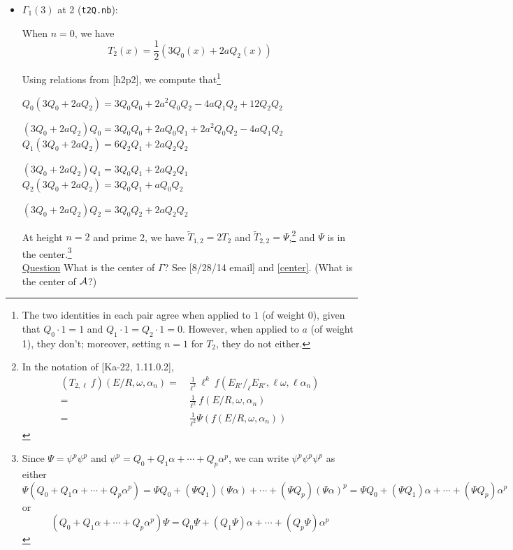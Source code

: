 \documentclass{rs}
\theoremstyle{definition}
\theoremstyle{remark}
\newcommand{\CA}{{\cal A}}
\newcommand{\A}{\alpha}
\newcommand{\G}{\Gamma}
\newcommand{\Tt}{\widetilde{T}}
\renewcommand{\=}{\approx}
\renewcommand{\-}{\sim}
\numberwithin{equation}{section}
\numberwithin{thm}{section}
\begin{document}
\begin{itemize}
 \item $\G_1(3)$ at 2 (\texttt{t2Q.nb}): 

 When $n = 0$, we have 
 \[
  T_2(x) = \dfrac{1}{2} (3 Q_0(x) + 2 a Q_2(x)) 
 \]

 Using relations from [h2p2], we compute that\footnote{The two identities in each pair agree when applied to $1$ (of weight 0), 
 given that $Q_0 \cdot 1 = 1$ and $Q_1 \cdot 1 = Q_2 \cdot 1 = 0$.  
 However, when applied to $a$ (of weight 1), they don't; 
 moreover, setting $n = 1$ for $T_2$, they do not either.  } 

 $Q_0 (3 Q_0 + 2 a Q_2) = 3 Q_0 Q_0 + 2 a^2 Q_0 Q_2 - 4 a Q_1 Q_2 + 12 Q_2 Q_2$ 

 $(3 Q_0 + 2 a Q_2) Q_0 = 3 Q_0 Q_0 + 2 a Q_0 Q_1 + 2 a^2 Q_0 Q_2 - 4 a Q_1 Q_2$ \\

 $Q_1 (3 Q_0 + 2 a Q_2) = 6 Q_2 Q_1 + 2 a Q_2 Q_2$ 

 $(3 Q_0 + 2 a Q_2) Q_1 = 3 Q_0 Q_1 + 2 a Q_2 Q_1$ \\

 $Q_2 (3 Q_0 + 2 a Q_2) = 3 Q_0 Q_1 + a Q_0 Q_2$ 

 $(3 Q_0 + 2 a Q_2) Q_2 = 3 Q_0 Q_2 + 2 a Q_2 Q_2$ 

 At height $n = 2$ and prime 2, we have $\Tt_{1,2} = 2 T_2$ and $\Tt_{2,2} = \Psi$,\footnote{In the notation of [Ka-22, 1.11.0.2], 
 \begin{equation*}
  \begin{split}
   (T_{2,\ell} ~ f) (E/R, \omega, \A_n) = & ~ \frac{1}{\ell^2} ~ \ell^k ~ f(E_{R'} / _\ell E_{R'}, \ell \omega, \ell \A_n) \\
                                        = & ~ \frac{1}{\ell^2} ~ f(E/R, \omega, \A_n) \\
                                        = & ~ \frac{1}{\ell^2} \Psi\!\left( f(E/R, \omega, \A_n) \right) 
  \end{split}
 \end{equation*}
 } 
 and $\Psi$ is in the center.\footnote{Since $\Psi = \psi^p \psi^p$ and $\psi^p = Q_0 + Q_1 \A + \cdots + Q_p \A^p$, 
 we can write $\psi^p \psi^p \psi^p$ as either 
 \[
  \Psi (Q_0 + Q_1 \A + \cdots + Q_p \A^p) = \Psi Q_0 + (\Psi Q_1) (\Psi \A) + \cdots + (\Psi Q_p) (\Psi \A)^p = \Psi Q_0 + (\Psi Q_1) \A + \cdots + (\Psi Q_p) \A^p 
 \]
 or 
 \[
  (Q_0 + Q_1 \A + \cdots + Q_p \A^p) \Psi = Q_0 \Psi + (Q_1 \Psi) \A + \cdots + (Q_p \Psi) \A^p 
 \]}  \\
 \underline{Question} \quad
 What is the center of $\G$?  See [8/28/14 email] and \eqref{center}.  
 (What is the center of $\CA$?)  \\


\end{itemize}
\end{document}
